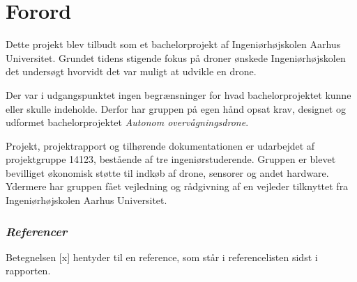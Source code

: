 \chapter{Forord}

Dette projekt blev tilbudt som et bachelorprojekt af Ingeniørhøjskolen Aarhus Universitet. Grundet tidens stigende fokus på droner ønskede Ingeniørhøjskolen det undersøgt hvorvidt det var muligt at udvikle en drone.

Der var i udgangspunktet ingen begrænsninger for hvad bachelorprojektet kunne eller skulle indeholde. Derfor har gruppen på egen hånd opsat krav, designet og udformet bachelorprojektet \textit{Autonom overvågningsdrone}.
 
Projekt, projektrapport og tilhørende dokumentationen er udarbejdet af projektgruppe 14123, bestående af tre ingeniørstuderende. Gruppen er blevet bevilliget økonomisk støtte til indkøb af drone, sensorer og andet hardware. Ydermere har gruppen fået vejledning og rådgivning af en vejleder tilknyttet fra Ingeniørhøjskolen Aarhus Universitet.  \\


\subsection*{\textit{Referencer} \vspace{-0.3cm}}
Betegnelsen [x] hentyder til en reference, som står i referencelisten sidst i rapporten. 